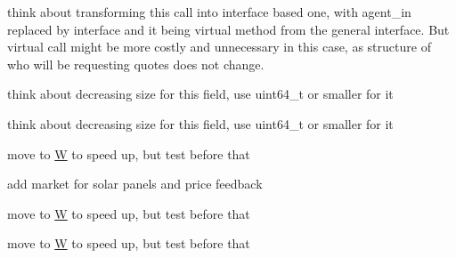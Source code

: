 \begin{DoxyRefList}
\item[\label{_dev_stage2__DevStage2000020}%
\hypertarget{_dev_stage2__DevStage2000020}{}%
Member \hyperlink{classsolar__core_1_1_s_e_i_ad532ca9d30d5988e051b75e33ce6c241}{solar\+\_\+core\+:\+:S\+E\+I\+:\+:form\+\_\+online\+\_\+quote} (std\+::shared\+\_\+ptr$<$ P\+V\+Project $>$ project\+\_\+)]think about transforming this call into interface based one, with agent\+\_\+in replaced by interface and it being virtual method from the general interface. But virtual call might be more costly and unnecessary in this case, as structure of who will be requesting quotes does not change.  
\item[\label{_dev_stage2__DevStage2000018}%
\hypertarget{_dev_stage2__DevStage2000018}{}%
Member \hyperlink{classsolar__core_1_1_s_e_i_a5fc331197d08788392c3af1903f25763}{solar\+\_\+core\+:\+:S\+E\+I\+:\+:location\+\_\+y} ]think about decreasing size for this field, use uint64\+\_\+t or smaller for it  
\item[\label{_dev_stage2__DevStage2000019}%
\hypertarget{_dev_stage2__DevStage2000019}{}%
Member \hyperlink{classsolar__core_1_1_s_e_i_a41711b0f344d6f29ea48dbcdb08b9c4e}{solar\+\_\+core\+:\+:S\+E\+I\+:\+:project\+\_\+states\+\_\+to\+\_\+delete} ]think about decreasing size for this field, use uint64\+\_\+t or smaller for it  
\item[\label{_dev_stage2__DevStage2000013}%
\hypertarget{_dev_stage2__DevStage2000013}{}%
Member \hyperlink{classsolar__core_1_1_s_e_i_af885d50c89decf5b6ff208c24cedd82b}{solar\+\_\+core\+:\+:S\+E\+I\+:\+:S\+E\+I} (const Property\+Tree \&pt\+\_\+, \hyperlink{classsolar__core_1_1_w}{W} $\ast$w\+\_\+)]move to \hyperlink{classsolar__core_1_1_w}{W} to speed up, but test before that  
\item[\label{_dev_stage2__DevStage2000022}%
\hypertarget{_dev_stage2__DevStage2000022}{}%
Class \hyperlink{classsolar__core_1_1_s_e_m}{solar\+\_\+core\+:\+:S\+E\+M} ]add market for solar panels and price feedback  
\item[\label{_dev_stage2__DevStage2000021}%
\hypertarget{_dev_stage2__DevStage2000021}{}%
Member \hyperlink{classsolar__core_1_1_s_e_m_a60d13fcadec26853d8461d32eefb97da}{solar\+\_\+core\+:\+:S\+E\+M\+:\+:S\+E\+M} (const Property\+Tree \&pt\+\_\+, \hyperlink{classsolar__core_1_1_w}{W} $\ast$w\+\_\+)]move to \hyperlink{classsolar__core_1_1_w}{W} to speed up, but test before that  
\item[\label{_dev_stage2__DevStage2000023}%
\hypertarget{_dev_stage2__DevStage2000023}{}%
Member \hyperlink{classsolar__core_1_1_utility_aa52a4877b6281d4ffa8f003b831e802c}{solar\+\_\+core\+:\+:Utility\+:\+:Utility} (const Property\+Tree \&pt\+\_\+, \hyperlink{classsolar__core_1_1_w}{W} $\ast$w\+\_\+)]move to \hyperlink{classsolar__core_1_1_w}{W} to speed up, but test before that  

\end{DoxyRefList}
